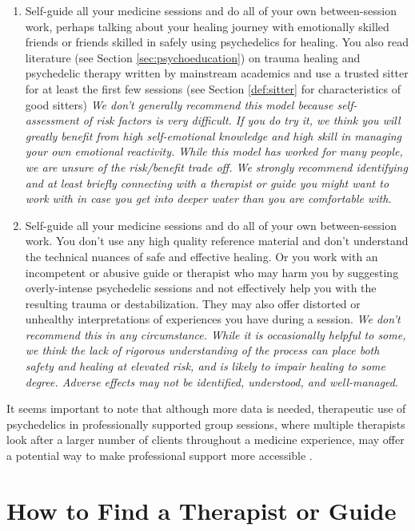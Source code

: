 \documentclass[12pt,letterpaper]{book}
\begin{document}
\begin{enumerate}
    \item Self-guide all your medicine sessions and do all of your own between-session work, perhaps talking about your healing journey with emotionally skilled friends or friends skilled in safely using psychedelics for healing. You also read literature (see Section \ref{sec:psychoeducation}) on trauma healing and psychedelic therapy written by mainstream academics and use a trusted sitter for at least the first few sessions (see Section \ref{def:sitter} for characteristics of good sitters) \textit{We don't generally recommend this model because self-assessment of risk factors is very difficult. If you do try it, we think you will greatly benefit from high self-emotional knowledge and high skill in managing your own emotional reactivity. While this model has worked for many people, we are unsure of the risk/benefit trade off. We strongly recommend identifying and at least briefly connecting with a therapist or guide you might want to work with in case you get into deeper water than you are comfortable with.}
    \item Self-guide all your medicine sessions and do all of your own between-session work. You don't use any high quality reference material and don't understand the technical nuances of safe and effective healing. Or you work with an incompetent or abusive guide or therapist who may harm you by suggesting overly-intense psychedelic sessions and not effectively help you with the resulting trauma or destabilization. They may also offer distorted or unhealthy interpretations of experiences you have during a session. \textit{We don't recommend this in any circumstance. While it is occasionally helpful to some, we think the lack of rigorous understanding of the process can place both safety and healing at elevated risk, and is likely to impair healing to some degree. Adverse effects may not be identified, understood, and well-managed}.
\end{enumerate}
It seems important to note that although more data is needed, therapeutic use of psychedelics in professionally supported group sessions, where multiple therapists look after a larger number of clients throughout a medicine experience, may offer a potential way to make professional support more accessible \cite{marseille2023group}.

\section{How to Find a Therapist or Guide}
\label{sec:howtofind}
\end{document}
